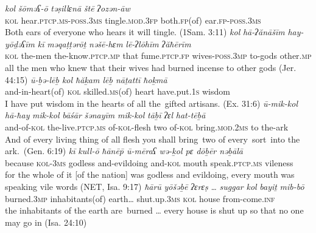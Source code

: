 \documentclass[output=paper]{langsci/langscibook}
\begin{document}
\ea%
    \label{ex:doron:51}
    \ea
    \gll \textit{kol}   \textit{šōməʕ-ō}                           \textit{təṣillɛnā}             \textit{štē}               \textit{ʔozən-āw}\\
         \textsc{kol} hear.\textsc{ptcp.ms-poss.3ms}  tingle.\textsc{mod.3fp}  both.\textsc{fp}(of)  ear.\textsc{fp-poss.3ms}  \\
    \glt Both ears of everyone who hears it will tingle. (1Sam. 3:11)
    \ex
    \gll \textit{kol}   \textit{hā-ʔănāšīm}   \textit{hay-yōḏəʕīm}          \textit{kī}      \textit{məqaṭṭərōṯ}      \textit{nəšē-hɛm}             \textit{lē-ʔlōhīm}  \textit{ʔăħērīm}\\
         \textsc{kol} the-men         the-know.\textsc{ptcp.mp} that  fume.\textsc{ptcp.fp}   wives-\textsc{poss.3mp}  to-gods     other\textsc{.mp}\\
    \glt all the men who knew that their wives had burned incense to other gods (Jer. 44:15)
    \ex
    \gll \textit{ū-ḇə{}-lēḇ              kol   ħăḵam             lēḇ       nāṯattī           ħoḵmā}\\
         and-in-heart(of) \textsc{kol} skilled.\textsc{ms}(of) heart   have.put.\textsc{1s}  wisdom\\
    \glt I have put wisdom in the hearts of all the~gifted artisans. (Ex. 31:6)
    \ex
    \gll \textit{ū-mik-kol}    \textit{hā-ħay}                 \textit{mik-kol} \textit{bāśār} \textit{šənayīm} \textit{mik-kol}   \textit{tāḇī} \textit{ʔɛl} \textit{hat-tēḇā} \\
         and-of-\textsc{kol} the-live.\textsc{ptcp.ms} of-\textsc{kol-}flesh   two        of-\textsc{kol}    bring.\textsc{mod.2ms} to the-ark\\
    \glt And of every living thing of all flesh you shall bring~two of every~sort~into the ark.~(Gen. 6:19)
    \ex
    \gll \textit{kī}            \textit{kull-ō}      \textit{ħānē\={p}    ū-mēraʕ          wə-ḵol     pɛ          dōḇēr                nəḇālā}\\
         because  \textsc{kol-3ms} godless and-evildoing  and-\textsc{kol} mouth  speak.\textsc{ptcp.ms}  vileness\\
    \glt for the whole of it [of the nation] was godless and evildoing, every mouth was speaking vile words (NET, Isa. 9:17)
    \ex
    \gll \textit{ħārū}             \textit{yōšəḇē}             \textit{ʔɛrɛṣ} \textit{…}  \textit{suggar}           \textit{kol}   \textit{bayiṯ}     \textit{mib-bō}\\
         burned.\textsc{3mp}  inhabitants(of) earth…  shut.up.\textsc{3ms}   \textsc{kol}  house  from-come.\textsc{inf}\\
    \glt the inhabitants of the earth are~burned … every house is shut up so that no one may go in (Isa. 24:10)
    \z
\z
\end{document}
